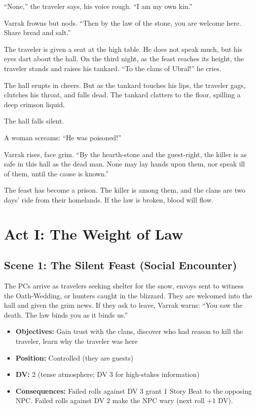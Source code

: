 \documentclass[11pt]{article}
\begin{document}
``None,'' the traveler says, his voice rough. ``I am my own kin.''

Varrak frowns but nods. ``Then by the law of the stone, you are welcome here. Share bread and salt.''

The traveler is given a seat at the high table. He does not speak much, but his eyes dart about the hall. On the third night, as the feast reaches its height, the traveler stands and raises his tankard. ``To the clans of Ubral!'' he cries.

The hall erupts in cheers. But as the tankard touches his lips, the traveler gags, clutches his throat, and falls dead. The tankard clatters to the floor, spilling a deep crimson liquid.

The hall falls silent.

A woman screams: ``He was poisoned!''

Varrak rises, face grim. ``By the hearth-stone and the guest-right, the killer is as safe in this hall as the dead man. None may lay hands upon them, nor speak ill of them, until the cause is known.''

The feast has become a prison. The killer is among them, and the clans are two days' ride from their homelands. If the law is broken, blood will flow.

\section*{Act I: The Weight of Law}

\subsection*{Scene 1: The Silent Feast (Social Encounter)}
The PCs arrive as travelers seeking shelter for the snow, envoys sent to witness the Oath-Wedding, or hunters caught in the blizzard. They are welcomed into the hall and given the grim news. If they ask to leave, Varrak warns: ``You saw the death. The law binds you as it binds us.''

\begin{itemize}
    \item \textbf{Objectives:} Gain trust with the clans, discover who had reason to kill the traveler, learn why the traveler was here
    \item \textbf{Position:} Controlled (they are guests)
    \item \textbf{DV:} 2 (tense atmosphere; DV 3 for high-stakes information)
    \item \textbf{Consequences:} Failed rolls against DV 3 grant 1 Story Beat to the opposing NPC. Failed rolls against DV 2 make the NPC wary (next roll +1 DV).
\end{itemize}
\end{document}
